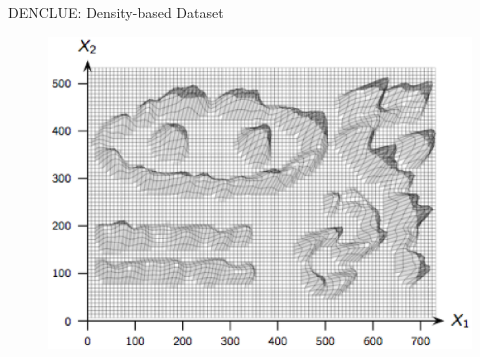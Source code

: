 \begin{frame}{DENCLUE: Density-based Dataset}
\begin{figure}
  \includegraphics[scale=0.6]{CLUST/density/figs/draftfigs/denclueNCclusters.eps}
%
\end{figure}
\end{frame}
